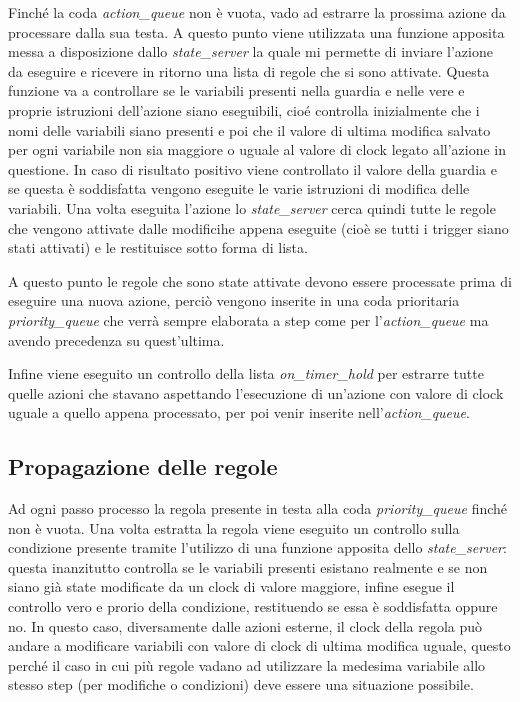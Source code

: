 \documentclass[italian]{memoir}
\begin{document}
Finché la coda \textit{action\_queue} non è vuota, vado ad estrarre la prossima azione da processare dalla sua testa. A questo punto viene utilizzata una funzione apposita messa a disposizione dallo \textit{state\_server} la quale mi permette di inviare l'azione da eseguire e ricevere in ritorno una lista di regole che si sono attivate. Questa funzione va a controllare se le variabili presenti nella guardia e nelle vere e proprie istruzioni dell'azione siano eseguibili, cioé controlla inizialmente che i nomi delle variabili siano presenti e poi che il valore di ultima modifica salvato per ogni variabile non sia maggiore o uguale al valore di clock legato all'azione in questione. In caso di risultato positivo viene controllato il valore della guardia e se questa è soddisfatta vengono eseguite le varie istruzioni di modifica delle variabili. Una volta eseguita l'azione lo \textit{state\_server} cerca quindi tutte le regole che vengono attivate dalle modificihe appena eseguite (cioè se tutti i trigger siano stati attivati) e le restituisce sotto forma di lista.

A questo punto le regole che sono state attivate devono essere processate prima di eseguire una nuova azione, perciò vengono inserite in una coda prioritaria \textit{priority\_queue} che verrà sempre elaborata a step come per l'\textit{action\_queue} ma avendo precedenza su quest'ultima.

Infine viene eseguito un controllo della lista \textit{on\_timer\_hold} per estrarre tutte quelle azioni che stavano aspettando l'esecuzione di un'azione con valore di clock uguale a quello appena processato, per poi venir inserite nell'\textit{action\_queue}. 

\subsection{Propagazione delle regole}

Ad ogni passo processo la regola presente in testa alla coda \textit{priority\_queue} finché non è vuota. Una volta estratta la regola viene eseguito un controllo sulla condizione presente tramite l'utilizzo di una funzione apposita dello \textit{state\_server}: questa inanzitutto controlla se le variabili presenti esistano realmente e se non siano già state modificate da un clock di valore maggiore, infine esegue il controllo vero e prorio della condizione, restituendo se essa è soddisfatta oppure no. In questo caso, diversamente dalle azioni esterne, il clock della regola può andare a modificare variabili con valore di clock di ultima modifica uguale, questo perché il caso in cui più regole vadano ad utilizzare la medesima variabile allo stesso step (per modifiche o condizioni) deve essere una situazione possibile.
\end{document}
